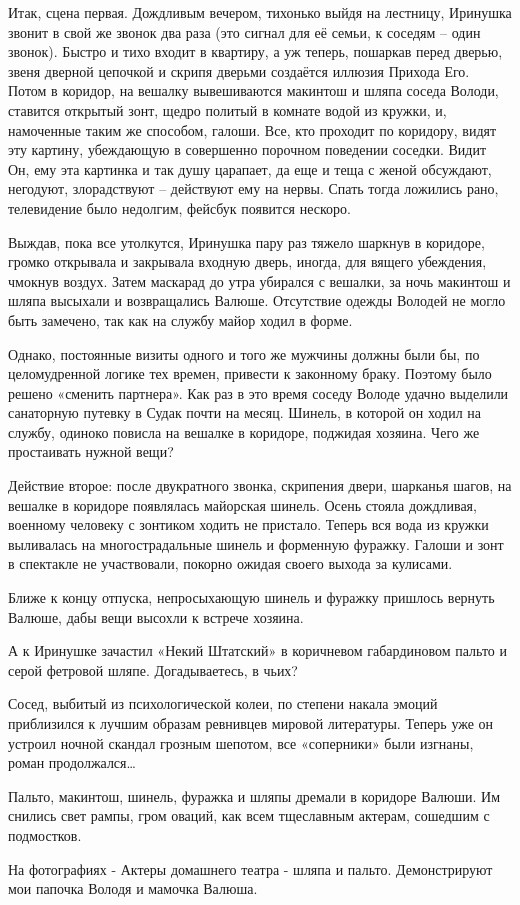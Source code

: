 Итак, сцена первая. Дождливым вечером, тихонько выйдя на лестницу, Иринушка
звонит в свой же звонок два раза (это сигнал для её семьи, к соседям – один
звонок). Быстро и тихо входит в квартиру, а уж теперь, пошаркав перед дверью,
звеня дверной цепочкой и скрипя дверьми создаётся иллюзия Прихода Его. Потом в
коридор, на вешалку вывешиваются макинтош и шляпа соседа Володи, ставится
открытый зонт, щедро политый в комнате водой из кружки, и, намоченные таким же
способом, галоши. Все, кто проходит по коридору, видят эту картину, убеждающую
в совершенно порочном поведении соседки. Видит Он, ему эта картинка и так душу
царапает, да еще и теща с женой обсуждают, негодуют, злорадствуют – действуют
ему на нервы. Спать тогда ложились рано, телевидение было недолгим, фейсбук
появится нескоро.

Выждав, пока все утолкутся, Иринушка пару раз тяжело шаркнув в коридоре, громко
открывала и закрывала входную дверь, иногда, для вящего убеждения, чмокнув
воздух. Затем маскарад до утра убирался с вешалки, за ночь макинтош и шляпа
высыхали и возвращались Валюше. Отсутствие одежды Володей не могло быть
замечено, так как на службу майор ходил в форме.

Однако, постоянные визиты одного и того же мужчины должны были бы, по
целомудренной логике тех времен, привести к законному браку. Поэтому было
решено «сменить партнера». Как раз в это время соседу Володе удачно выделили
санаторную путевку в Судак почти на месяц. Шинель, в которой он ходил на
службу, одиноко повисла на вешалке в коридоре, поджидая хозяина. Чего же
простаивать нужной вещи?

Действие второе: после двукратного звонка, скрипения двери, шарканья шагов, на
вешалке в коридоре появлялась майорская шинель. Осень стояла дождливая,
военному человеку с зонтиком ходить не пристало. Теперь вся вода из кружки
выливалась на многострадальные шинель и форменную фуражку. Галоши и зонт в
спектакле не участвовали, покорно ожидая своего выхода за кулисами.

Ближе к концу отпуска, непросыхающую шинель и фуражку пришлось вернуть Валюше,
дабы вещи высохли к встрече хозяина.

А к Иринушке зачастил «Некий Штатский» в коричневом габардиновом пальто и серой
фетровой шляпе. Догадываетесь, в чьих?

Сосед, выбитый из психологической колеи, по степени накала эмоций приблизился к
лучшим образам ревнивцев мировой литературы. Теперь уже он устроил ночной
скандал грозным шепотом, все «соперники» были изгнаны, роман продолжался…

Пальто, макинтош, шинель, фуражка и шляпы дремали в коридоре Валюши. Им снились
свет рампы, гром оваций, как всем тщеславным актерам, сошедшим с подмостков.

На фотографиях - Актеры домашнего театра - шляпа и пальто. Демонстрируют мои
папочка Володя и мамочка Валюша.

